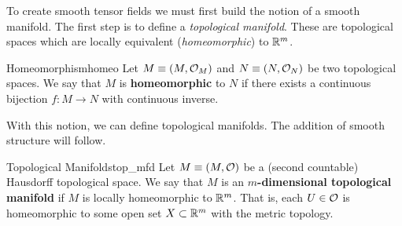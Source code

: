 

To create smooth tensor fields we must first build the notion of a smooth manifold. The first step is to define a \emph{topological manifold}.  These are topological spaces which are locally equivalent (\emph{homeomorphic}) to $\mathbb{R}^m$.  
\begin{df}{Homeomorphism}{homeo}
Let $M\equiv(M,\mathcal{O}_M)$ and $N\equiv(N,\mathcal{O}_N)$ be two topological spaces.  We say that $M$ is \textbf{homeomorphic} to $N$ if there exists a continuous bijection $f\colon M \to N$ with continuous inverse.
\end{df}

With this notion, we can define topological manifolds.  The addition of smooth structure will follow.

\begin{df}{Topological Manifolds}{top_mfd}
Let $M\equiv(M,\mathcal{O})$ be a (second countable) Hausdorff topological space.  We say that $M$ is an \textbf{$m$-dimensional topological manifold} if $M$ is locally homeomorphic to $\mathbb{R}^m$. That is, each $U\in \mathcal{O}$ is homeomorphic to some open set $X\subset \mathbb{R}^m$ with the metric topology.
\end{df}

